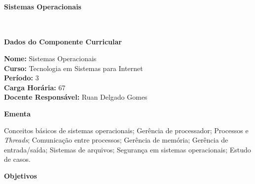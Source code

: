 \paragraph{Sistemas Operacionais} \


\begin{snugshade}\begin{center}\textbf{
    Dados do Componente Curricular
}\end{center}\end{snugshade}

\noindent \textbf{Nome:}                Sistemas Operacionais
\\        \textbf{Curso:}               Tecnologia em Sistemas para Internet
\\        \textbf{Período:}             \unit{3}{\degree}
\\        \textbf{Carga Horária:}       \unit{67}{\hour}
\\        \textbf{Docente Responsável:} Ruan Delgado Gomes


\begin{snugshade}\begin{center}\textbf{
    Ementa
\vphantom{q}}\end{center}\end{snugshade}

\noindent
Conceitos básicos de sistemas operacionais; Gerência de processador; Processos e \textit{Threads}; Comunicação entre processos; Gerência de memória; Gerência de entrada/saída; Sistemas de arquivos; Segurança em sistemas operacionais; Estudo de casos.


\begin{snugshade}\begin{center}\textbf{
    Objetivos
}\end{center}\end{snugshade}

